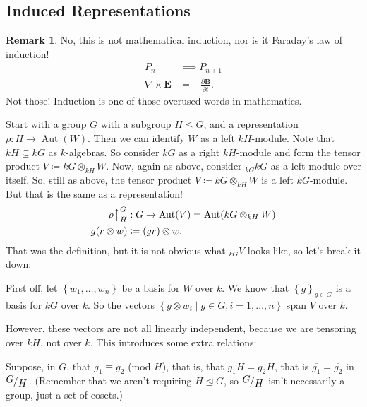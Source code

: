 \documentclass[12pt]{article}
\newcommand\setb[1]{\left \{ #1 \right \}}
\newcommand{\quotient}[2]{{\makebox[\width-2.3pt][l]{\raisebox{.2em}{$#1$}}\left/\raisebox{-.2em}{$#2$}\right.}}
\theoremstyle{definition}
\newtheorem*{remark}{Remark}
\DeclareMathOperator\Aut{Aut}
\begin{document}
\subsection{Induced Representations}
 \begin{remark}
    No, this is not mathematical induction, nor is it Faraday's law of induction!
    \begin{align}
        P_n & \implies P_{n+1} \\
        \nabla \times \mathbf{E} & = -\frac{\partial \mathbf{B}}{\partial t}.
    \end{align}
    Not those! Induction is one of those overused words in mathematics.
\end{remark}
Start with a group $G$ with a subgroup $H \leq G$, and a representation $\rho : H \to \Aut(W)$. Then we can identify $W$ as a left $kH$-module. Note that $kH \subseteq kG$ as $k$-algebras. So consider $kG$ as a right $kH$-module and form the tensor product $V \coloneqq  kG \otimes_{kH} W$. Now, again as above, consider $_{kG} kG$ as a left module over itself. So, still as above, the tensor product $V \coloneqq  kG \otimes_{kH} W$ is a left $kG$-module. But that is the same as a representation!
\begin{equation}
    \begin{split}
        \rho \big\uparrow_H^G & : G \to \Aut(V) = \Aut(kG \otimes_{kH} W) \\
        g ( r \otimes w) & \coloneqq  (gr) \otimes w.
    \end{split}
\end{equation}
That was the definition, but it is not obvious what $_{kG}V$ looks like, so let's break it down: 

First off, let $\setb{w_1 , \dotsc , w_n}$ be a basis for $W$ over $k$. We know that $\setb{ g }_{g \in G}$ is a basis for $kG$ over $k$. So the vectors $\setb{g \otimes w_i \mid g \in G , i = 1 , \dotsc , n}$ span $V$ over $k$.

However, these vectors are not all linearly independent, because we are tensoring over $kH$, not over $k$. This introduces some extra relations: 

Suppose, in $G$, that $g_1 \equiv g_2$ (mod $H$), that is, that $g_1 H = g_2 H$, that is $\overline{g_1} = \overline{g_2}$ in $\quotient{G}{H}$. (Remember that we aren't requiring $H \trianglelefteq G$, so $\quotient{G}{H}$ isn't necessarily a group, just a set of cosets.)
\end{document}
